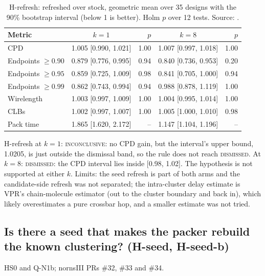 \begin{table}[t]
\caption{H-refresh: refreshed over stock, geometric mean over 35 designs with the 90\% bootstrap interval (below 1 is better). Holm $p$ over 12 tests. Source: .}
\label{tab:refresh}
\centering\footnotesize\setlength{\tabcolsep}{3pt}
\begin{tabular}{@{}lcrcr@{}}
\toprule
Metric & $k=1$ & $p$ & $k=8$ & $p$ \\
\midrule
CPD & 1.005 [0.990, 1.021] & 1.00 & 1.007 [0.997, 1.018] & 1.00 \\
Endpoints $\geq0.90$ & 0.879 [0.776, 0.995] & 0.94 & 0.840 [0.736, 0.953] & 0.20 \\
Endpoints $\geq0.95$ & 0.859 [0.725, 1.009] & 0.98 & 0.841 [0.705, 1.000] & 0.94 \\
Endpoints $\geq0.99$ & 0.862 [0.743, 0.994] & 0.94 & 0.988 [0.878, 1.119] & 1.00 \\
Wirelength & 1.003 [0.997, 1.009] & 1.00 & 1.004 [0.995, 1.014] & 1.00 \\
CLBs & 1.002 [0.997, 1.007] & 1.00 & 1.005 [1.000, 1.010] & 0.98 \\
Pack time & 1.865 [1.620, 2.172] & -- & 1.147 [1.104, 1.196] & -- \\
\bottomrule
\end{tabular}
\end{table}

 H-refresh at $k=1$: \textsc{inconclusive}: no CPD gain, but the interval's upper bound, 1.0205, is just outside the dismissal band, so the rule does not reach \textsc{dismissed}. At $k=8$: \textsc{dismissed}: the CPD interval lies inside [0.98, 1.02]. The hypothesis is not supported at either $k$. Limits: the seed refresh is part of both arms and the candidate-side refresh was not separated; the intra-cluster delay estimate is VPR's chain-molecule estimator (out to the cluster boundary and back in), which likely overestimates a pure crossbar hop, and a smaller estimate was not tried.

\subsection{Is there a seed that makes the packer rebuild the known clustering? (H-seed, H-seed-b)}
\label{sec:e-seedoracle}

 HS0 and Q-N1b; nornsIII PRs \#32, \#33 and \#34.


